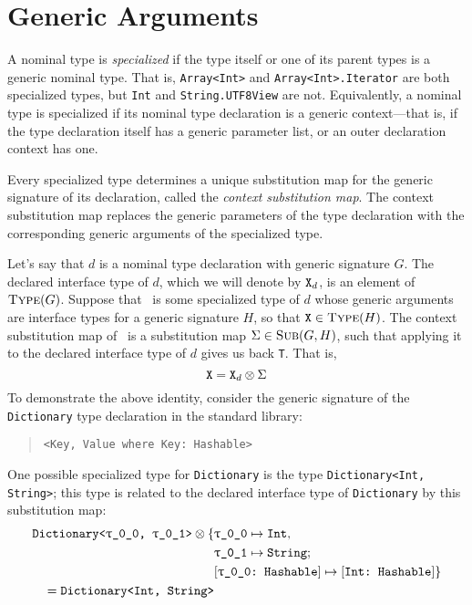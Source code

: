 \documentclass[../generics]{subfiles}
\begin{document}
\section{Generic Arguments}\label{contextsubstmap}

A nominal type is \emph{specialized} if the type itself or one of its parent types is a generic nominal type. That is, \texttt{Array<Int>} and \texttt{Array<Int>.Iterator} are both specialized types, but \texttt{Int} and \texttt{String.UTF8View} are not. Equivalently, a nominal type is specialized if its nominal type declaration is a generic context---that is, if the type declaration itself has a generic parameter list, or an outer declaration context has one.

Every specialized type determines a unique substitution map for the generic signature of its declaration, called the \emph{context substitution map}. The context substitution map replaces the generic parameters of the type declaration with the corresponding generic arguments of the specialized type.

Let's say that $d$ is a nominal type declaration with generic signature $G$. The declared interface type of $d$, which we will denote by $\texttt{X}_d$, is an element of $\textsc{Type}({G})$. Suppose that \tX\ is some specialized type of $d$ whose generic arguments are interface types for a generic signature $H$, so that $\texttt{X}\in\textsc{Type}({H})$. The context substitution map of \tX\ is a substitution map $\Sigma\in\textsc{Sub}({G, H})$, such that applying it to the declared interface type of $d$ gives us back \texttt{T}. That is,
\[
\texttt{X} = \texttt{X}_d\otimes\Sigma
\]
To demonstrate the above identity, consider the generic signature of the \texttt{Dictionary} type declaration in the standard library:
\begin{quote}
\texttt{<Key, Value where Key:\ Hashable>}
\end{quote}
One possible specialized type for \texttt{Dictionary} is the type \texttt{Dictionary<Int, String>}; this type is related to the declared interface type of \texttt{Dictionary} by this substitution map:
\begin{align*}
\texttt{Dictionary<\ttgp{0}{0}, \ttgp{0}{1}>}\otimes
\SubstMapC{
&\SubstType{\ttgp{0}{0}}{Int},\\
&\SubstType{\ttgp{0}{1}}{String}
}{\\
&\SubstConf{\ttgp{0}{0}}{Int}{Hashable}
}\\
{} = \texttt{Dictionary<Int, String>}
\end{align*}
\end{document}
